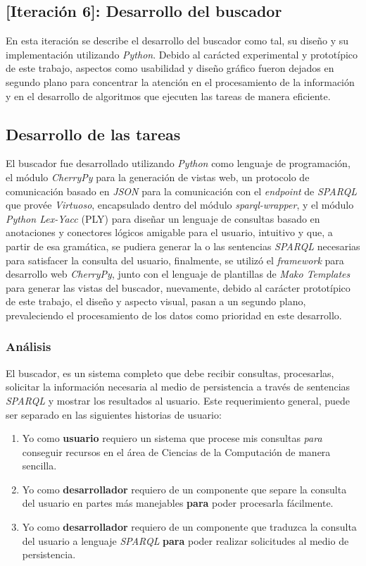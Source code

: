 \begin{itemize}
\section{[Iteración 6]: Desarrollo del buscador}
En esta iteración se describe el desarrollo del buscador como tal, su diseño y su implementación utilizando \textit{Python}. Debido al carácted experimental y prototípico de este trabajo, aspectos como usabilidad y diseño gráfico fueron dejados en segundo plano para concentrar la atención en el procesamiento de la información y en el desarrollo de algoritmos que ejecuten las tareas de manera eficiente.

\subsection{Desarrollo de las tareas}
El buscador fue desarrollado utilizando \textit{Python} como lenguaje de programación, el módulo \textit{CherryPy} para la generación de vistas web, un protocolo de comunicación basado en \textit{JSON} para la comunicación con el \textit{endpoint} de \textit{SPARQL} que provée \textit{Virtuoso}, encapsulado dentro del módulo \textit{sparql-wrapper}, y el módulo \textit{Python Lex-Yacc} (PLY) para diseñar un lenguaje de consultas basado en anotaciones y conectores lógicos amigable para el usuario, intuitivo y que, a partir de esa gramática, se pudiera generar la o las sentencias \textit{SPARQL} necesarias para satisfacer la consulta del usuario, finalmente, se utilizó el \textit{framework} para desarrollo web \textit{CherryPy}, junto con el lenguaje de plantillas de \textit{Mako Templates} para generar las vistas del buscador, nuevamente, debido al carácter prototípico de este trabajo, el diseño y aspecto visual, pasan a un segundo plano, prevaleciendo el procesamiento de los datos como prioridad en este desarrollo.

\subsubsection{Análisis}
El buscador, es un sistema completo que debe recibir consultas, procesarlas, solicitar la información necesaria al medio de persistencia a través de sentencias \textit{SPARQL} y mostrar los resultados al usuario. Este requerimiento general, puede ser separado en las siguientes historias de usuario:

\begin{enumerate}
    \item Yo como \textbf{usuario} requiero un sistema que procese mis consultas \textit{para} conseguir recursos en el área de Ciencias de la Computación de manera sencilla.
    \item Yo como \textbf{desarrollador} requiero de un componente que separe la consulta del usuario en partes más manejables \textbf{para} poder procesarla fácilmente.
    \item Yo como \textbf{desarrollador} requiero de un componente que traduzca la consulta del usuario a lenguaje \textit{SPARQL} \textbf{para} poder realizar solicitudes al medio de persistencia.
\end{enumerate}


\end{itemize}
